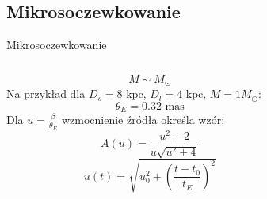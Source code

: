 \documentclass{beamer}
\begin{document}
\subsection{Mikrosoczewkowanie}
\begin{frame}{Mikrosoczewkowanie}
    \begin{columns}
        \begin{column}{0.6\linewidth}
            \[M \sim M_{\odot}\]
            Na przykład dla $D_s = 8 \text{ kpc}$, $D_l = 4 \text{ kpc}$, $M = 1 M_{\odot}$:
            \[\theta_E = 0.32 \text{ mas}\]
            Dla $u = \frac{\beta}{\theta_E}$ wzmocnienie źródła określa wzór\cite{Schneider1992}:
            \[A(u) = \frac{u^2 + 2}{u \sqrt{u^2 + 4}}\]
            \[u(t) = \sqrt{u_0^2 + \left(\frac{t-t_0}{t_E}\right)^2}\]
        \end{column}
        \begin{column}{0.4\linewidth}
            \begin{figure}
                \centering

\end{figure}
\end{column}
\end{columns}
\end{frame}
\end{document}
